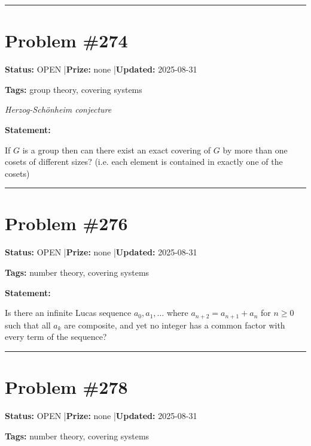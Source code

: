 \documentclass{article}
\begin{document}
\noindent\rule{\linewidth}{0.4pt}


\section{Problem \#274}
\label{prob:274}

\noindent\textbf{Status:} OPEN \quad|\quad \textbf{Prize:} none \quad|\quad \textbf{Updated:} 2025-08-31

\noindent\textbf{Tags:} group theory, covering systems

\medskip
\noindent\textit{Herzog-Schönheim conjecture}


\noindent\textbf{Statement:}

If $G$ is a group then can there exist an exact covering of $G$ by more than one cosets of different sizes? (i.e. each element is contained in exactly one of the cosets)

\noindent\rule{\linewidth}{0.4pt}


\section{Problem \#276}
\label{prob:276}

\noindent\textbf{Status:} OPEN \quad|\quad \textbf{Prize:} none \quad|\quad \textbf{Updated:} 2025-08-31

\noindent\textbf{Tags:} number theory, covering systems

\medskip

\noindent\textbf{Statement:}

Is there an infinite Lucas sequence $a_0,a_1,\ldots$ where $a_{n+2}=a_{n+1}+a_n$ for $n\geq 0$ such that all $a_k$ are composite, and yet no integer has a common factor with every term of the sequence?

\noindent\rule{\linewidth}{0.4pt}


\section{Problem \#278}
\label{prob:278}

\noindent\textbf{Status:} OPEN \quad|\quad \textbf{Prize:} none \quad|\quad \textbf{Updated:} 2025-08-31

\noindent\textbf{Tags:} number theory, covering systems
\end{document}
